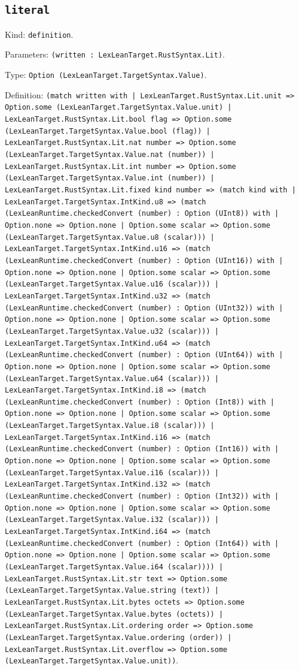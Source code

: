 \documentclass[11pt]{article}
\begin{document}
\subsection*{\texttt{literal}}
\noindent Kind: \texttt{definition}.\par
\noindent Parameters: \texttt{(written : LexLeanTarget.RustSyntax.Lit)}.\par
\noindent Type: \texttt{Option (LexLeanTarget.TargetSyntax.Value)}.\par
\noindent Definition: \texttt{(match written with | LexLeanTarget.RustSyntax.Lit.unit => Option.some (LexLeanTarget.TargetSyntax.Value.unit) | LexLeanTarget.RustSyntax.Lit.bool flag => Option.some (LexLeanTarget.TargetSyntax.Value.bool (flag)) | LexLeanTarget.RustSyntax.Lit.nat number => Option.some (LexLeanTarget.TargetSyntax.Value.nat (number)) | LexLeanTarget.RustSyntax.Lit.int number => Option.some (LexLeanTarget.TargetSyntax.Value.int (number)) | LexLeanTarget.RustSyntax.Lit.fixed kind number => (match kind with | LexLeanTarget.TargetSyntax.IntKind.u8 => (match (LexLeanRuntime.checkedConvert (number) : Option (UInt8)) with | Option.none => Option.none | Option.some scalar => Option.some (LexLeanTarget.TargetSyntax.Value.u8 (scalar))) | LexLeanTarget.TargetSyntax.IntKind.u16 => (match (LexLeanRuntime.checkedConvert (number) : Option (UInt16)) with | Option.none => Option.none | Option.some scalar => Option.some (LexLeanTarget.TargetSyntax.Value.u16 (scalar))) | LexLeanTarget.TargetSyntax.IntKind.u32 => (match (LexLeanRuntime.checkedConvert (number) : Option (UInt32)) with | Option.none => Option.none | Option.some scalar => Option.some (LexLeanTarget.TargetSyntax.Value.u32 (scalar))) | LexLeanTarget.TargetSyntax.IntKind.u64 => (match (LexLeanRuntime.checkedConvert (number) : Option (UInt64)) with | Option.none => Option.none | Option.some scalar => Option.some (LexLeanTarget.TargetSyntax.Value.u64 (scalar))) | LexLeanTarget.TargetSyntax.IntKind.i8 => (match (LexLeanRuntime.checkedConvert (number) : Option (Int8)) with | Option.none => Option.none | Option.some scalar => Option.some (LexLeanTarget.TargetSyntax.Value.i8 (scalar))) | LexLeanTarget.TargetSyntax.IntKind.i16 => (match (LexLeanRuntime.checkedConvert (number) : Option (Int16)) with | Option.none => Option.none | Option.some scalar => Option.some (LexLeanTarget.TargetSyntax.Value.i16 (scalar))) | LexLeanTarget.TargetSyntax.IntKind.i32 => (match (LexLeanRuntime.checkedConvert (number) : Option (Int32)) with | Option.none => Option.none | Option.some scalar => Option.some (LexLeanTarget.TargetSyntax.Value.i32 (scalar))) | LexLeanTarget.TargetSyntax.IntKind.i64 => (match (LexLeanRuntime.checkedConvert (number) : Option (Int64)) with | Option.none => Option.none | Option.some scalar => Option.some (LexLeanTarget.TargetSyntax.Value.i64 (scalar)))) | LexLeanTarget.RustSyntax.Lit.str text => Option.some (LexLeanTarget.TargetSyntax.Value.string (text)) | LexLeanTarget.RustSyntax.Lit.bytes octets => Option.some (LexLeanTarget.TargetSyntax.Value.bytes (octets)) | LexLeanTarget.RustSyntax.Lit.ordering order => Option.some (LexLeanTarget.TargetSyntax.Value.ordering (order)) | LexLeanTarget.RustSyntax.Lit.overflow => Option.some (LexLeanTarget.TargetSyntax.Value.unit))}.\par
\end{document}
